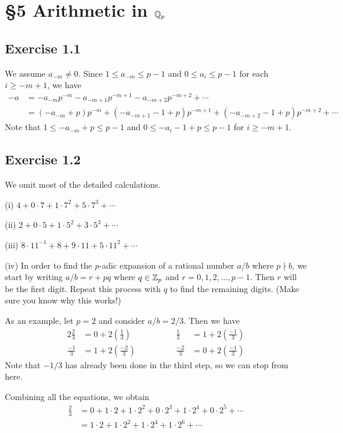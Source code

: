 \documentclass[../Koblitz.tex]{subfiles}
\begin{document}
\section*{\S5 Arithmetic in \texorpdfstring{$\mathbb{Q}_p$}{Qp}}

\subsection*{Exercise 1.1}
We assume $a_{-m}\neq0$. Since $1\leq a_{-m} \leq p-1$ and $0\leq a_i \leq p-1$ for each $i\geq-m+1$, we have
\begin{align*}
    -a &= -a_{-m}p^{-m} - a_{-m+1}p^{-m+1} - a_{-m+2}p^{-m+2} + \cdots \\
    &= (-a_{-m}+p)p^{-m}+(-a_{-m+1}-1+p)p^{-m+1}+(-a_{-m+2}-1+p)p^{-m+2}+\cdots
\end{align*}
Note that $1\leq -a_{-m}+p\leq p-1$ and $0\leq -a_i-1+p\leq p-1$ for $i\geq-m+1$.

\subsection*{Exercise 1.2}

We omit most of the detailed calculations.

(i) $4+0\cdot7+1\cdot7^2+5\cdot7^3+\cdots$

(ii) $2+0\cdot5+1\cdot5^2+3\cdot5^3+\cdots$

(iii) $8\cdot11^{-1}+8+9\cdot11+5\cdot11^2+\cdots$

(iv) In order to find the $p$-adic expansion of a rational number $a/b$ where $p\nmid b$, we start by writing $a/b=r+pq$ where $q\in\mathbb{Z}_p$ and $r=0,1,2,\ldots,p-1$. Then $r$ will be the first digit. Repeat this process with $q$ to find the remaining digits. (Make sure you know why this works!)

As an example, let $p=2$ and consider $a/b=2/3$. Then we have
\begin{alignat*}{2}
    \frac{2}{3}&=0 + 2\left(\frac{1}{3}\right) &\qquad\qquad \frac{1}{3}&=1 + 2\left(\frac{-1}{3}\right) \\
    \frac{-1}{3}&=1 + 2\left(\frac{-2}{3}\right) &\qquad\qquad
    \frac{-2}{3}&=0 + 2\left(\frac{-1}{3}\right)
\end{alignat*}
Note that $-1/3$ has already been done in the third step, so we can stop from here.

Combining all the equations, we obtain
\begin{align*}
    \frac{2}{3} &= 0+1\cdot2+1\cdot2^2+0\cdot2^3+1\cdot2^4+0\cdot2^5+\cdots \\
    &= 1\cdot2+1\cdot2^2+1\cdot2^4+1\cdot2^6+\cdots
\end{align*}
\end{document}
